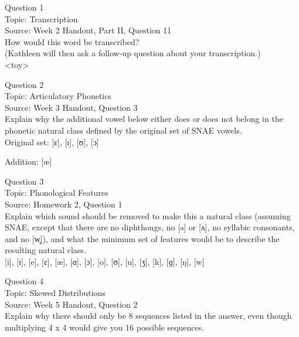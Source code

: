 \documentclass[12pt]{article}
\begin{document}
{\large Question 1}\\

Topic: Transcription\\
Source: Week 2 Handout, Part II, Question 11\\

How would this word be transcribed?\\ (Kathleen will then ask a follow-up question about your transcription.)\\

<toy>


\newpage

{\large Question 2}\\

Topic: Articulatory Phonetics\\
Source: Week 3 Handout, Question 3\\

Explain why the additional vowel below either does or does not belong in the phonetic natural class defined by the original set of SNAE vowels.\\

Original set: {[ɛ]}, {[ɪ]}, {[ʊ]}, {[ɔ]}

Addition: {[æ]}


\newpage

{\large Question 3}\\

Topic: Phonological Features\\
Source: Homework 2, Question 1\\

Explain which sound should be removed to make this a natural class (assuming SNAE, except that there are no diphthongs, no [ə] or [ʌ], no syllabic consonants, and no [w̥]), and what the minimum set of features would be to describe the resulting natural class.\\

{[i]}, {[ɪ]}, {[e]}, {[ɛ]}, {[æ]}, {[ɑ]}, {[ɔ]}, {[o]}, {[ʊ]}, {[u]}, {[ʒ]}, {[k]}, {[ɡ]}, {[ŋ]}, {[w]}


\newpage

{\large Question 4}\\

Topic: Skewed Distributions\\
Source: Week 5 Handout, Question 2\\

Explain why there should only be 8 sequences listed in the answer, even though multiplying 4 x 4 would give you 16 possible sequences.\\
\end{document}
